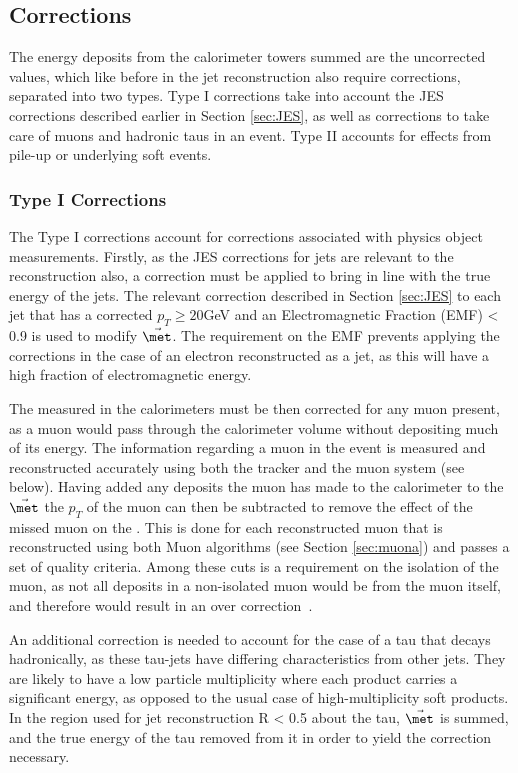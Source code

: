 \subsection{\met Corrections}

The energy deposits from the calorimeter towers summed are the uncorrected values, which like before in the jet reconstruction also require corrections, separated into two types. Type I corrections take into account the JES  corrections described earlier in Section \ref{sec:JES}, as well as corrections to take care of muons and hadronic taus in an event. Type II  accounts for effects from pile-up or underlying soft events.
 
\subsubsection{Type I Corrections}
The Type I corrections account for corrections associated with physics object measurements. Firstly, as the JES corrections for jets are relevant to the \met reconstruction also, a correction must be applied to bring \met in line with the true energy of the jets. The relevant correction described in Section \ref{sec:JES} to each jet that has a corrected $p_{T} \geq 20 $GeV and an Electromagnetic Fraction (EMF) < 0.9 is used to modify $\vec{\met}$. The requirement on the EMF prevents applying the corrections in the case of an electron reconstructed as a jet, as this will have a high fraction of electromagnetic  energy.

The \met measured in the calorimeters must be then corrected for any muon present, as a muon would pass through the calorimeter volume without depositing much of its energy. The information regarding a muon in the event is measured and reconstructed accurately using both the tracker and the muon system (see below). Having added any deposits the muon has made to the calorimeter to the $\vec{\met}$ the $p_{T}$ of the muon can then be subtracted to remove the effect of the missed muon on the \met. This is done for each reconstructed muon that is reconstructed using both Muon algorithms (see Section \ref{sec:muona}) and passes a set of quality criteria. Among these cuts is a requirement on the isolation of the muon, as not all deposits in a non-isolated muon would be from the muon itself, and therefore would result in an over correction~\cite{etmissnote}. 

An additional correction is needed to account for the case of a tau that decays hadronically, as these tau-jets have differing characteristics from other jets. They are likely to have a low particle multiplicity where each product carries a significant energy, as opposed to the usual case of high-multiplicity soft products. In the region used for jet reconstruction R < 0.5 about the tau, $\vec{\met}$ is summed, and the true energy of the tau removed from it in order to yield the correction necessary.  

